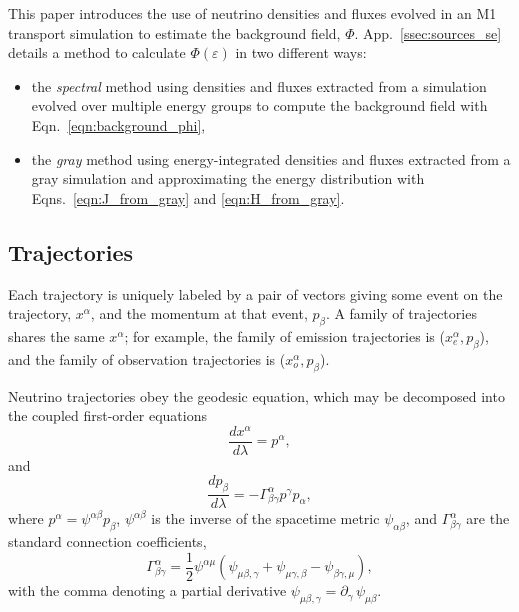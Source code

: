 \documentclass[aps,floatfix,prd,superscriptaddress,twocolumn]{revtex4-1}
\begin{document}
This paper introduces the use of neutrino densities and fluxes evolved in an
M1 transport simulation to estimate the background field, $\Phi$.
App.~\ref{ssec:sources_se} details a method to calculate
$\Phi(\varepsilon)$ in two different ways:
\begin{itemize}
\item
  the \emph{spectral} method using densities and fluxes
  extracted from a simulation evolved over multiple energy groups
  to compute the background field with Eqn.~\ref{eqn:background_phi},
\item
  the \emph{gray} method using energy-integrated densities and fluxes
  extracted from a gray simulation and approximating the
  energy distribution with Eqns.~\ref{eqn:J_from_gray} and
  \ref{eqn:H_from_gray}.
\end{itemize}

\subsection{Trajectories}
\label{ssec:trajectories}
Each trajectory is uniquely labeled by a pair of vectors
giving some event on the trajectory, $x^\alpha$,
and the momentum at that event, $p_\beta$.
A family of trajectories shares the same $x^\alpha$; for example,
the family of emission trajectories is ($x^\alpha_e,p_\beta$),
and the family of observation trajectories is ($x^\alpha_o,p_\beta$).

Neutrino trajectories obey the geodesic equation, which may be decomposed into
the coupled first-order equations
\begin{equation}
\label{eqn:geodesic_x}
  \frac{d x^\alpha}{d\lambda} = p^\alpha,
\end{equation}
and
\begin{equation}
\label{eqn:geodesic_p}
  \frac{d p_\beta}{d\lambda} = -\Gamma^\alpha_{\beta\gamma} p^\gamma p_\alpha,
\end{equation}
where $p^\alpha=\psi^{\alpha\beta}p_\beta$,
$\psi^{\alpha\beta}$ is the inverse of the spacetime metric $\psi_{\alpha\beta}$,
and $\Gamma^\alpha_{\beta\gamma}$ are the standard connection coefficients,
\begin{equation}
  \label{eqn:christoffel}
  \Gamma^\alpha_{\beta\gamma} =
  \frac{1}{2} \psi^{\alpha\mu}
  (\psi_{\mu\beta,\gamma} + \psi_{\mu\gamma,\beta} - \psi_{\beta\gamma,\mu}),
\end{equation}
with the comma denoting a partial derivative
$\psi_{\mu\beta,\gamma}=\partial_\gamma\,\psi_{\mu\beta}$.
\end{document}
